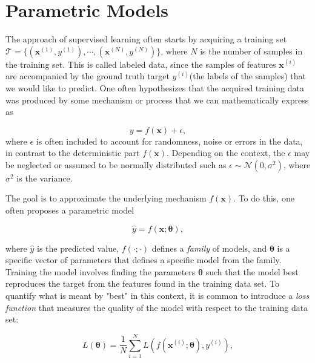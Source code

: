 \section{Parametric Models}\label{sec:ParametricModels}
The approach of supervised learning often starts by acquiring a training set $\mathcal{T} = \{(\boldsymbol{x}^{(1)}, y^{(1)}), \cdots, (\boldsymbol{x}^{(N)}, y^{(N)})\}$, where $N$ is the number of samples in the training set. This is called labeled data, since the samples of features $\boldsymbol{x}^{(i)}$ are accompanied by the ground truth target $y^{(i)}$(the labels of the samples) that we would like to predict. One often hypothesizes that the acquired training data was produced by some mechanism or process that we can mathematically express as

\begin{equation*}
    y = f(\boldsymbol{x}) + \epsilon,
\end{equation*}
where $\epsilon$ is often included to account for randomness, noise or errors in the data, in contrast to the deterministic part $f(\boldsymbol{x})$. Depending on the context, the $\epsilon$ may be neglected or assumed to be normally distributed such as $\epsilon \sim \mathcal{N}(0, \sigma^2)$, where $\sigma^2$ is the variance.

The goal is to approximate the underlying mechanism $f(\boldsymbol{x})$. To do this, one often proposes a parametric model

\begin{equation*}
    \hat{y} = f(\boldsymbol{x}; \boldsymbol{\theta}),
\end{equation*}

where $\hat{y}$ is the predicted value, $f(\cdot; \cdot)$ defines a \emph{family} of models, and $\boldsymbol{\theta}$ is a specific vector of parameters that defines a specific model from the family. Training the model involves finding the parameters $\boldsymbol{\theta}$ such that the model best reproduces the target from the features found in the training data set. To quantify what is meant by "best" in this context, it is common to introduce a \emph{loss function} that measures the quality of the model with respect to the training data set:

\begin{equation}\label{eq:LossFunction}
    L(\boldsymbol{\theta}) = \frac{1}{N}\sum_{i=1}^{N} L(f(\boldsymbol{x}^{(i)}; \boldsymbol{\theta}) , y^{(i)}),
\end{equation}

